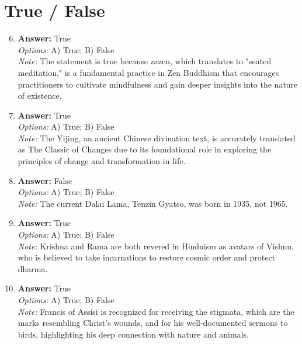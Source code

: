 \documentclass[12pt]{article}
\begin{document}
\section*{True / False}
\begin{enumerate}[label=\arabic*.]
\setcounter{enumi}{5}
\item \textbf{Answer:} True
\\ \textit{Options:} A) True; B) False
\\ \textit{Note:} The statement is true because zazen, which translates to "seated meditation," is a fundamental practice in Zen Buddhism that encourages practitioners to cultivate mindfulness and gain deeper insights into the nature of existence.
\item \textbf{Answer:} True
\\ \textit{Options:} A) True; B) False
\\ \textit{Note:} The Yijing, an ancient Chinese divination text, is accurately translated as The Classic of Changes due to its foundational role in exploring the principles of change and transformation in life.
\item \textbf{Answer:} False
\\ \textit{Options:} A) True; B) False
\\ \textit{Note:} The current Dalai Lama, Tenzin Gyatso, was born in 1935, not 1965.
\item \textbf{Answer:} True
\\ \textit{Options:} A) True; B) False
\\ \textit{Note:} Krishna and Rama are both revered in Hinduism as avatars of Vishnu, who is believed to take incarnations to restore cosmic order and protect dharma.
\item \textbf{Answer:} True
\\ \textit{Options:} A) True; B) False
\\ \textit{Note:} Francis of Assisi is recognized for receiving the stigmata, which are the marks resembling Christ's wounds, and for his well-documented sermons to birds, highlighting his deep connection with nature and animals.
\end{enumerate}
\end{document}
